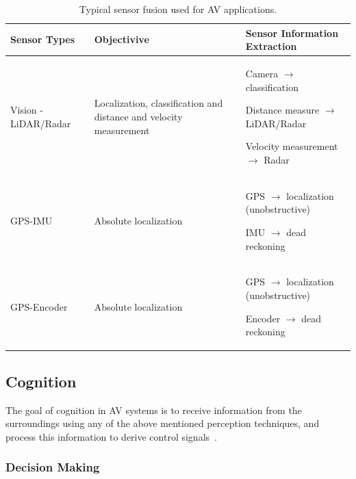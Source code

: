 \documentclass{article}
\begin{document}
\begin{table}[htbp]
\caption{Typical sensor fusion used for AV applications.}
\begin{center}
\begin{tabular}{|l|p{2in}|p{2.5in}|}
\hline
\textbf{Sensor Types} & \textbf{Objectivive} & \textbf{Sensor Information Extraction} \\
\hline
Vision - LiDAR/Radar & Localization, classification and distance and velocity measurement & Camera $\rightarrow$ classification

Distance measure $\rightarrow$ LiDAR/Radar

Velocity measurement $\rightarrow$ Radar \\
\hline
GPS-IMU & Absolute localization & GPS $\rightarrow$ localization (unobstructive)

IMU $\rightarrow$ dead reckoning \\
\hline
GPS-Encoder & Absolute localization & GPS $\rightarrow$ localization (unobstructive)

Encoder $\rightarrow$ dead reckoning \\
\hline
\end{tabular}
\end{center}
\label{tab:sensorfusion}
\end{table}

\subsection{Cognition}

The goal of cognition in AV systems is to receive information from the surroundings using any of the above mentioned perception techniques, and process this information to derive control signals~\cite{Naoki2014}. 

\subsubsection{Decision Making}
\end{document}
